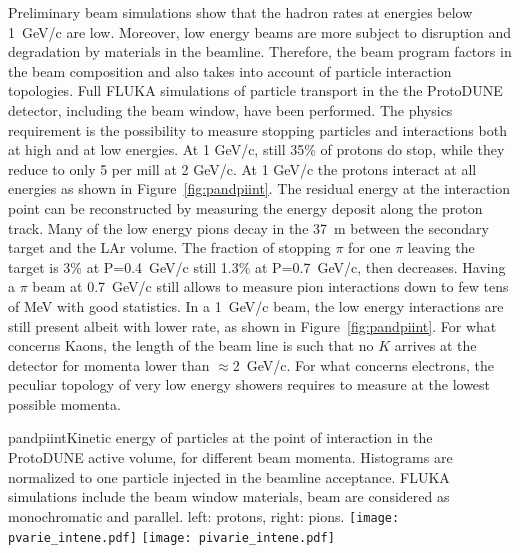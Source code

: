 Preliminary beam simulations show that the hadron rates at 
energies below 1~GeV/c are low. Moreover, low energy beams are more
subject to disruption and degradation by materials in the
beamline. Therefore, the beam program factors in the beam composition and also takes
into account of particle interaction topologies.  Full FLUKA\cite{fluka05,Fluka15}
 simulations
of particle transport in the the ProtoDUNE detector, including the
beam window, have been performed.
 The physics requirement is the possibility to measure
 stopping particles and  interactions both at high and at low energies.    
At 1 GeV/c, still 35\% of protons do stop, while they reduce to only 5
per mill at 2 GeV/c.  At  1 GeV/c  the protons interact at all
energies as shown in
Figure~\ref{fig:pandpiint}. The residual energy at the interaction
point can be reconstructed by measuring the energy deposit along the proton track.
Many of the  low energy pions decay in the 37~m between the secondary target
and the LAr volume.  The fraction of stopping $\pi$ for one $\pi$
leaving the target is 3\% at P=0.4~GeV/c still  1.3\% at P=0.7~GeV/c,
then decreases.  Having a $\pi$ beam at 0.7~GeV/c still allows to
measure pion interactions down to few tens of MeV with good
statistics. In a 1~GeV/c beam, the low energy interactions are still
present albeit with lower rate, as shown in Figure~\ref{fig:pandpiint}.
For what concerns Kaons, the length of the beam line is such that no
$K$ arrives at the detector for momenta lower than $\approx$2~GeV/c.
For what concerns electrons, the peculiar topology of very low energy
showers requires to measure at the lowest possible momenta.
\begin{cdrfigure}{pandpiint}{Kinetic energy of
    particles at the point of interaction in the ProtoDUNE active
    volume, for different beam momenta. Histograms are normalized to one particle injected in the
    beamline acceptance. FLUKA simulations include the beam window
    materials, beam are considered as monochromatic and
    parallel. left: protons, right: pions.}
  \texttt{[image: pvarie\_intene.pdf]}
  \texttt{[image: pivarie\_intene.pdf]}
\end{cdrfigure}


